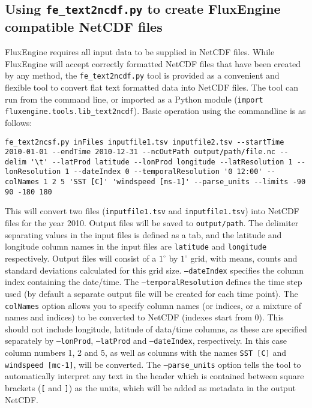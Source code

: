 \documentclass[]{scrartcl}
\begin{document}
\subsection{Using \texttt{fe\_text2ncdf.py} to create FluxEngine compatible NetCDF files} \label{text2ncdf_example}
FluxEngine requires all input data to be supplied in NetCDF files. While FluxEngine will accept correctly formatted NetCDF files that have been created by any method, the \texttt{fe\_text2ncdf.py} tool is provided as a convenient and flexible tool to convert flat text formatted data into NetCDF files. The tool can run from the command line, or imported as a Python module (\texttt{import fluxengine.tools.lib\_text2ncdf}). Basic operation using the commandline is as follows:
\begin{lstlisting}
fe_text2ncsf.py inFiles inputfile1.tsv inputfile2.tsv --startTime 2010-01-01 --endTime 2010-12-31 --ncOutPath output/path/file.nc --delim '\t' --latProd latitude --lonProd longitude --latResolution 1 --lonResolution 1 --dateIndex 0 --temporalResolution '0 12:00' --colNames 1 2 5 'SST [C]' 'windspeed [ms-1]' --parse_units --limits -90 90 -180 180
\end{lstlisting}

This will convert two files (\texttt{inputfile1.tsv} and \texttt{inputfile1.tsv}) into NetCDF files for the year 2010. Output files will be saved to \texttt{output/path}. The delimiter separating values in the input files is defined as a tab, and the latitude and longitude column names in the input files are \texttt{latitude} and \texttt{longitude} respectively. Output files will consist of a $1^\circ$ by $1^\circ$ grid, with means, counts and standard deviations calculated for this grid size. \texttt{--dateIndex} specifies the column index containing the date/time. The \texttt{--temporalResolution} defines the time step used (by default a separate output file will be created for each time point). The \texttt{colNames} option allows you to specify column names (or indices, or a mixture of names and indices) to be converted to NetCDF (indexes start from 0). This should not include longitude, latitude of data/time columns, as these are specified separately by \texttt{--lonProd}, \texttt{--latProd} and \texttt{--dateIndex}, respectively. In this case column numbers 1, 2 and 5, as well as columns with the names \texttt{SST [C]} and \texttt{windspeed [mc-1]}, will be converted. The \texttt{--parse\_units} option tells the tool to automatically interpret any text in the header which is contained between square brackets (\texttt{[} and \texttt{]}) as the units, which will be added as metadata in the output NetCDF.
\end{document}
